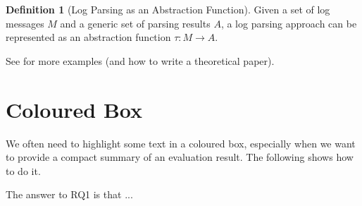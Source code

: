 \documentclass{article}
\theoremstyle{definition}
\newtheorem{definition}{Definition}
\begin{document}
\begin{framed}
\begin{definition}[Log Parsing as an Abstraction Function]
Given a set of log messages $M$ and a generic set of parsing results $A$,
a log parsing approach can be represented as an abstraction function $\tau \colon M \to A$.
\end{definition}
\end{framed}

See \cite{rv2021} for more examples (and how to write a theoretical paper). 


\section{Coloured Box}

We often need to highlight some text in a coloured box, especially when we want to provide a compact summary of an evaluation result. The following shows how to do it.

\begin{tcolorbox}
    The answer to RQ1 is that ...
\end{tcolorbox}

 
 
\end{document}

